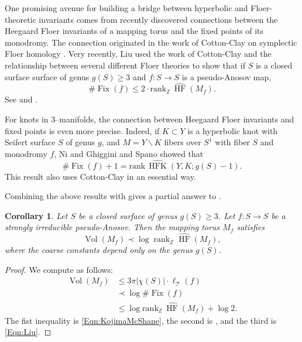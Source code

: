 \documentclass[11pt,letterpaper]{amsart}
\newcommand{\rank}[0]{\text{rank}}
\newcommand{\ZZ}[0]{\mathbb{Z}}
\newcommand{\teich}{\mathcal T}
\newcommand{\HFK}{\operatorname{HFK}}
\newcommand{\HF}{\operatorname{HF}}
\newcommand{\Fix}{\operatorname{Fix}}
\numberwithin{equation}{section}
\newtheorem{corollary}[theorem]{Corollary}
\theoremstyle{definition}
\renewcommand{\setminus}{\smallsetminus}
\newcommand{\from}{\colon} %
\DeclareMathOperator{\vol}{Vol}
\begin{document}
One promising avenue for building a bridge between hyperbolic and Floer-theoretic invariants comes from recently discovered connections between the Heegaard Floer invariants of a mapping torus and the fixed points of its monodromy. The connection originated in the work of Cotton-Clay on symplectic Floer homology \cite{CottonClay:Symplectic}.
Very recently, Liu \cite{Liu:EntropyVolume} used the work of Cotton-Clay and the relationship between several different Floer theories to show that if $S$ is a closed surface surface of genus $g(S) \geq 3$ and $f \from S \to S$ is a pseudo-Anosov map, 
\begin{equation}\label{Eqn:Liu}
\#\Fix(f) \leq 2 \cdot \rank_{\ZZ} \, \widehat{\HF}(M_f).
\end{equation}
See \cite[Proposition 4.3]{Liu:EntropyVolume} and \cite[computation on page 29]{Liu:EntropyVolume}.

For knots in $3$--manifolds, the connection between Heegaard Floer invariants and fixed points is even more precise. 
Indeed, if $K \subset Y$ is a hyperbolic knot with Seifert surface $S$ of genus $g$, and $M = Y \setminus K$ fibers over $S^1$ with fiber $S$ and monodromy $f$, Ni \cite{Ni:FixedPointNote, Ni:FixedPointsHFK} and Ghiggini and Spano \cite{GhigginiSpano} showed that
\begin{equation}\label{Eqn:NiGS}
\#\Fix(f) + 1 =   \rank \, \widehat{\HFK}(Y, K; g(S)-1).
\end{equation}
This result also uses Cotton-Clay \cite{CottonClay:Symplectic} in an essential way.

Combining the above results with  gives a partial answer to  .

\begin{corollary}\label{Cor:ClosedHF}
Let $S$ be a closed surface of genus $g(S) \geq 3$. Let $f \from S \to S$ be a strongly irreducible pseudo-Anosov. Then the mapping torus $M_f$ satisfies
\[
\vol(M_f) \prec \log \operatorname{rank}_{\ZZ} \widehat{\HF}(M_f),
\]
where the coarse constants depend only on the genus $g(S)$.
\end{corollary}


\begin{proof}%
We compute as follows:
\begin{align*}
\vol(M_f) & \leq 3\pi | \chi(S) | \cdot \ell_\teich(f) \\
& \prec \log \#\Fix(f) \\
& \leq \log \rank_{\ZZ} \, \widehat{\HF}(M_f) + \log 2.
\end{align*}
The fist inequality is \eqref{Eqn:KojimaMcShane}, the second is , and the third is \eqref{Eqn:Liu}.
\end{proof}
\end{document}
